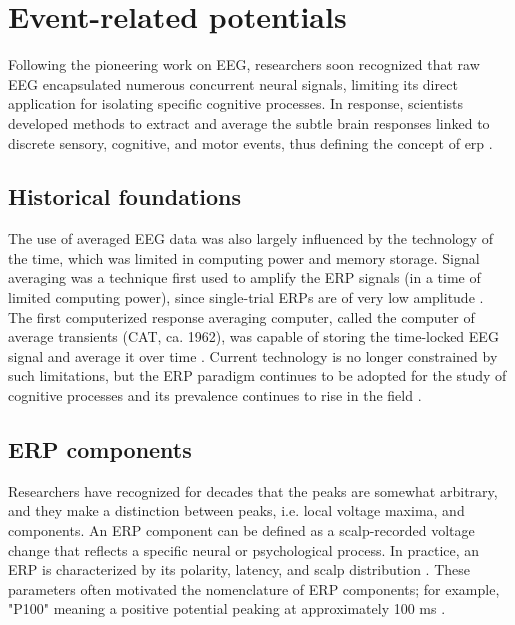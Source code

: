 
\section{Event-related potentials}

Following the pioneering work on EEG, researchers soon recognized that raw EEG encapsulated numerous concurrent neural signals, limiting its direct application for isolating specific cognitive processes. In response, scientists developed methods to extract and average the subtle brain responses linked to discrete sensory, cognitive, and motor events, thus defining the concept of \acrfull{erp} \cite{luckIntroductionEventrelatedPotential2014}.

\subsection{Historical foundations} 

The use of averaged EEG data was also largely influenced by the technology of the time, which was limited in computing power and memory storage. Signal averaging was a technique first used to amplify the ERP signals (in a time of limited computing power), since single-trial ERPs are of very low amplitude \cite{luckIntroductionEventrelatedPotential2014}. The first computerized response averaging computer, called the computer of average transients (CAT, ca. 1962), was capable of storing the time-locked EEG signal and average it over time \cite{delormeEEGLABOpensourceToolbox2004, delormeWhatBestERP2023}. Current technology is no longer constrained by such limitations, but the ERP paradigm continues to be adopted for the study of cognitive processes and its prevalence continues to rise in the field \cite{donoghueAutomatedMetaanalysisEventrelated2022}. 

\subsection{ERP components}

Researchers have recognized for decades that the peaks are somewhat arbitrary, and they make a distinction between peaks, i.e. local voltage maxima, and components. An ERP component can be defined as a scalp-recorded voltage change that reflects a specific neural or psychological process. In practice, an ERP is characterized by its polarity, latency, and scalp distribution \cite{luckIntroductionEventrelatedPotential2014}. These parameters often motivated the nomenclature of ERP components; for example, "P100" meaning a positive potential peaking at approximately 100 ms \cite{donoghueAutomatedMetaanalysisEventrelated2022}.

